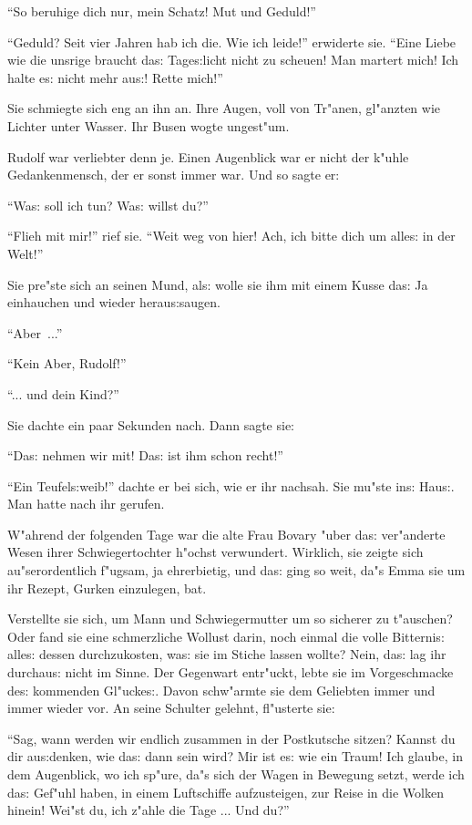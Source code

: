 \documentclass[oneside,12pt]{book}
\newcommand{\s}{s:}%
\begin{document}
"`So beruhige dich nur, mein Schatz! Mut und Geduld!"'

"`Geduld? Seit vier Jahren hab ich die. Wie ich leide!"' erwiderte
sie. "`Eine Liebe wie die unsrige braucht da{\s} Tage{\s}licht
nicht zu scheuen! Man martert mich! Ich halte e{\s} nicht mehr
au{\s}! Rette mich!"'

Sie schmiegte sich eng an ihn an. Ihre Augen, voll von Tr"anen,
gl"anzten wie Lichter unter Wasser. Ihr Busen wogte ungest"um.

Rudolf war verliebter denn je. Einen Augenblick war er nicht der
k"uhle Gedankenmensch, der er sonst immer war. Und so sagte er:

"`Wa{\s} soll ich tun? Wa{\s} willst du?"'

"`Flieh mit mir!"' rief sie. "`Weit weg von hier! Ach, ich bitte
dich um alle{\s} in der Welt!"'

Sie pre"ste sich an seinen Mund, al{\s} wolle sie ihm mit einem
Kusse da{\s} Ja einhauchen und wieder herau{\s}saugen.

"`Aber~..."'

"`Kein Aber, Rudolf!"'

"`... und dein Kind?"'

Sie dachte ein paar Sekunden nach. Dann sagte sie:

"`Da{\s} nehmen wir mit! Da{\s} ist ihm schon recht!"'

"`Ein Teufel{\s}weib!"' dachte er bei sich, wie er ihr nachsah.
Sie mu"ste in{\s} Hau{\s}. Man hatte nach ihr gerufen.

W"ahrend der folgenden Tage war die alte Frau Bovary "uber da{\s}
ver"anderte Wesen ihrer Schwiegertochter h"ochst verwundert.
Wirklich, sie zeigte sich au"serordentlich f"ugsam, ja ehrerbietig,
und da{\s} ging so weit, da"s Emma sie um ihr Rezept, Gurken
einzulegen, bat.

Verstellte sie sich, um Mann und Schwiegermutter um so sicherer zu
t"auschen? Oder fand sie eine schmerzliche Wollust darin, noch
einmal die volle Bitterni{\s} alle{\s} dessen durchzukosten,
wa{\s} sie im Stiche lassen wollte? Nein, da{\s} lag ihr
durchau{\s} nicht im Sinne. Der Gegenwart entr"uckt, lebte sie im
Vorgeschmacke de{\s} kommenden Gl"ucke{\s}. Davon schw"armte sie
dem Geliebten immer und immer wieder vor. An seine Schulter
gelehnt, fl"usterte sie:

"`Sag, wann werden wir endlich zusammen in der Postkutsche sitzen?
Kannst du dir au{\s}denken, wie da{\s} dann sein wird? Mir ist
e{\s} wie ein Traum! Ich glaube, in dem Augenblick, wo ich sp"ure,
da"s sich der Wagen in Bewegung setzt, werde ich da{\s} Gef"uhl
haben, in einem Luftschiffe aufzusteigen, zur Reise in die Wolken
hinein! Wei"st du, ich z"ahle die Tage ... Und du?"'
\end{document}
